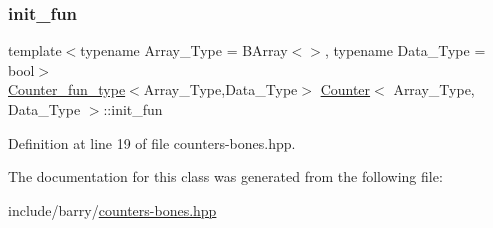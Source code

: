 \subsubsection{\texorpdfstring{init\+\_\+fun}{init\_fun}}
{\footnotesize\ttfamily template$<$typename Array\+\_\+\+Type = B\+Array$<$$>$, typename Data\+\_\+\+Type = bool$>$ \\
\hyperlink{typedefs_8hpp_ac0160f52f564dea3ac033b374cffbfe7}{Counter\+\_\+fun\+\_\+type}$<$Array\+\_\+\+Type,Data\+\_\+\+Type$>$ \hyperlink{class_counter}{Counter}$<$ Array\+\_\+\+Type, Data\+\_\+\+Type $>$\+::init\+\_\+fun}



Definition at line 19 of file counters-\/bones.\+hpp.



The documentation for this class was generated from the following file\+:\begin{DoxyCompactItemize}
\item 
include/barry/\hyperlink{counters-bones_8hpp}{counters-\/bones.\+hpp}\end{DoxyCompactItemize}

